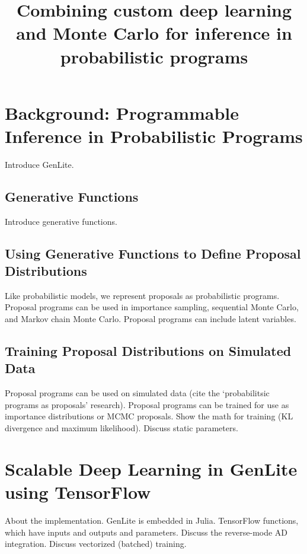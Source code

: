 \documentclass{article}
\title{Combining custom deep learning and Monte Carlo for inference in probabilistic programs}
\begin{document}
\maketitle

\begin{abstract}

\end{abstract}

\section{Background: Programmable Inference in Probabilistic Programs}
Introduce GenLite.

\subsection{Generative Functions}
Introduce generative functions.

\subsection{Using Generative Functions to Define Proposal Distributions}
Like probabilistic models, we represent proposals as probabilistic programs.
Proposal programs can be used in importance sampling, sequential Monte Carlo, and Markov chain Monte Carlo.
Proposal programs can include latent variables.

\subsection{Training Proposal Distributions on Simulated Data}
Proposal programs can be used on simulated data (cite the `probabilitsic programs as proposals' research).
Proposal programs can be trained for use as importance distributions or MCMC proposals.
Show the math for training (KL divergence and maximum likelihood).
Discuss static parameters.

\section{Scalable Deep Learning in GenLite using TensorFlow}
About the implementation.
GenLite is embedded in Julia.
TensorFlow functions, which have inputs and outputs and parameters.
Discuss the reverse-mode AD integration.
Discuss vectorized (batched) training.
\end{document}
